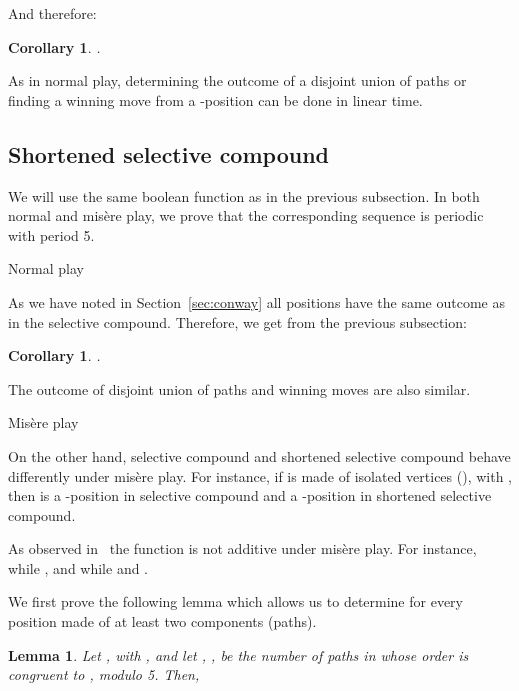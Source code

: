 \documentclass[11pt]{article}
\newcommand{\centre}[1]{\begin{center}#1\end{center}}
\newtheorem{lemma}[theorem]{Lemma}
\newtheorem{corollary}[theorem]{Corollary}
\begin{document}
And therefore:

\begin{corollary}
.
\end {corollary}

As in normal play, determining the outcome of a disjoint union
of paths or finding a winning move from a -position can be done
in linear time.

\subsection{Shortened selective compound}

We will use the same boolean function  as in
the previous subsection.
In both normal and mis\`ere play, we prove that
the corresponding sequence is periodic
with period 5.
\vskip 4mm

\centre{{\sc Normal play}}

As we have noted in Section~\ref{sec:conway} all positions have the same
outcome as in the selective compound. Therefore, we get from
the previous subsection:

\begin{corollary}
.
\end {corollary}

The outcome of disjoint union of paths and winning moves are also similar.

\vskip 4mm

\centre{{\sc Mis\`ere play}}

On the other hand, selective compound and shortened selective
compound behave differently under mis\`ere play.
For instance, if  is made of  isolated vertices
(), with , then
 is a -position in selective compound and a
-position in shortened selective compound.

As observed in~\cite[Chapter~14]{ONAG} the function 
is not additive under mis\`ere play.
For instance,  while  
,
and  while 
and .

We first prove the following lemma which allows us to determine
 for every position  made of at least two
components (paths).

\begin{lemma}
Let , with , and
let , , be the number of paths in  whose
order is congruent to , modulo 5. Then,\\

\label{lemma:sigma}
\end{lemma}
\end{document}
